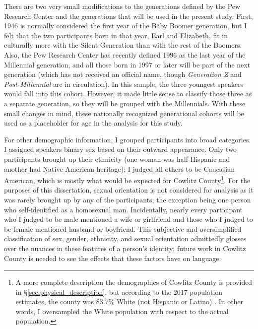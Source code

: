 
There are two very small modifications to the generations defined by the Pew Research Center and the generations that will be used in the present study. First, 1946 is normally considered the first year of the Baby Boomer generation, but I felt that the two participants born in that year, Earl and Elizabeth, fit in culturally more with the Silent Generation than with the rest of the Boomers. Also, the Pew Research Center \citep{dimock_2018} has recently defined 1996 as the last year of the Millennial generation, and all those born in 1997 or later will be part of the next generation (which has not received an official name, though \textit{Generation Z} and \textit{Post-Millennial} are in circulation). In this sample, the three youngest speakers would fall into this cohort. However, it made little sense to classify those three as a separate generation, so they will be grouped with the Millennials. With these small changes in mind, these nationally recognized generational cohorts will be used as a placeholder for age in the analysis for this study.

For other demographic information, I grouped participants into broad categories. I assigned speakers binary sex based on their outward appearance. Only two participants brought up their ethnicity (one woman was half-Hispanic and another had Native American heritage); I judged all others to be Caucasian American, which is mostly what would be expected for Cowlitz County\footnote{A more complete description the demographics of Cowlitz County is provided in \S\ref{sec:physical_description}, but according to the 2017 population estimates, the county was 83.7\% White (not Hispanic or Latino) \citep{census}. In other words, I oversampled the White population with respect to the actual population.}. For the purposes of this dissertation, sexual orientation is not considered for analysis as it was rarely brought up by any of the participants, the exception being one person who self-identified as a homosexual man. Incidentally, nearly every participant who I judged to be male mentioned a wife or girlfriend and those who I judged to be female mentioned husband or boyfriend. This subjective and oversimplified classification of sex, gender, ethnicity, and sexual orientation admittedly glosses over the nuances in these features of a person's identity; future work in Cowlitz County is needed to see the effects that these factors have on language.

